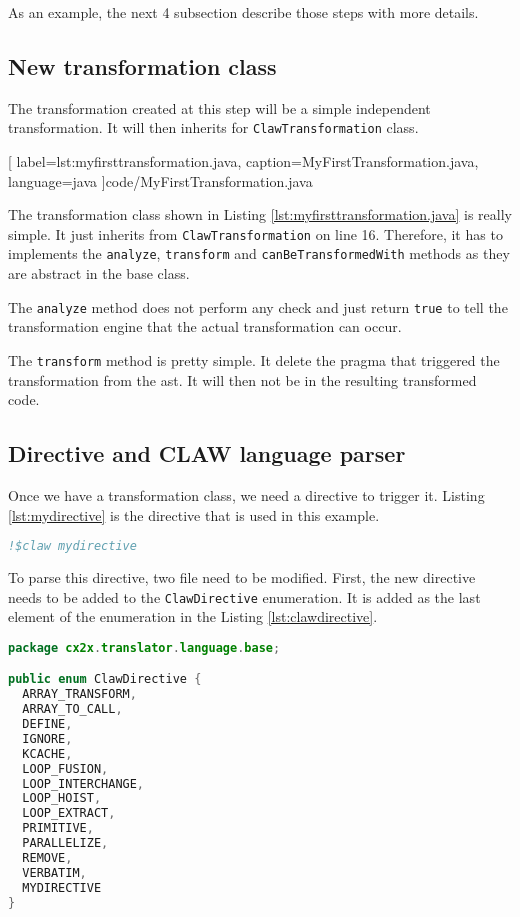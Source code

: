 As an example, the next 4 subsection describe those steps with more details.

\subsection{New transformation class}
The transformation created at this step will be a simple independent
transformation. It will then inherits for \lstinline|ClawTransformation| class.


  [
    label=lst:myfirsttransformation.java,
    caption=MyFirstTransformation.java,
    language=java
  ]{code/MyFirstTransformation.java}

The transformation class shown in Listing \ref{lst:myfirsttransformation.java}
is really simple. It just inherits from \lstinline|ClawTransformation| on line
16. Therefore, it has to implements the \lstinline|analyze|,
\lstinline|transform| and \lstinline|canBeTransformedWith| methods as they are
abstract in the base class.

The \lstinline|analyze| method does not perform any check and just return
\lstinline|true| to tell the transformation engine that the actual
transformation can occur.

The \lstinline|transform| method is pretty simple. It delete the pragma that
triggered the transformation from the \gls{ast}. It will then not be in the
resulting transformed code.

\subsection{Directive and CLAW language parser}
Once we have a transformation class, we need a directive to trigger it. Listing
\ref{lst:mydirective} is the directive that is used in this example.

\begin{lstlisting}[label=lst:mydirective, caption=Example directive, language=fortran]
!$claw mydirective
\end{lstlisting}

To parse this directive, two file need to be modified. First, the new directive
needs to be added to the \lstinline|ClawDirective| enumeration. It is added as
the last element of the enumeration in the Listing \ref{lst:clawdirective}.

\begin{lstlisting}[label=lst:clawdirective, caption=ClawDirective.java, language=java]
package cx2x.translator.language.base;

public enum ClawDirective {
  ARRAY_TRANSFORM,
  ARRAY_TO_CALL,
  DEFINE,
  IGNORE,
  KCACHE,
  LOOP_FUSION,
  LOOP_INTERCHANGE,
  LOOP_HOIST,
  LOOP_EXTRACT,
  PRIMITIVE,
  PARALLELIZE,
  REMOVE,
  VERBATIM,
  MYDIRECTIVE
}
\end{lstlisting}

